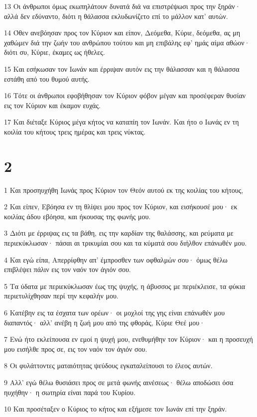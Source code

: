 \par 13 Οι άνθρωποι όμως εκωπηλάτουν δυνατά διά να επιστρέψωσι προς την ξηράν· αλλά δεν εδύναντο, διότι η θάλασσα εκλυδωνίζετο επί το μάλλον κατ' αυτών.
\par 14 Όθεν ανεβόησαν προς τον Κύριον και είπον, Δεόμεθα, Κύριε, δεόμεθα, ας μη χαθώμεν διά την ζωήν του ανθρώπου τούτου και μη επιβάλης εφ' ημάς αίμα αθώον· διότι συ, Κύριε, έκαμες ως ήθελες.
\par 15 Και εσήκωσαν τον Ιωνάν και έρριψαν αυτόν εις την θάλασσαν και η θάλασσα εστάθη από του θυμού αυτής.
\par 16 Τότε οι άνθρωποι εφοβήθησαν τον Κύριον φόβον μέγαν και προσέφεραν θυσίαν εις τον Κύριον και έκαμον ευχάς.
\par 17 Και διέταξε Κύριος μέγα κήτος να καταπίη τον Ιωνάν. Και ήτο ο Ιωνάς εν τη κοιλία του κήτους τρεις ημέρας και τρεις νύκτας.

\chapter{2}

\par 1 Και προσηυχήθη Ιωνάς προς Κύριον τον Θεόν αυτού εκ της κοιλίας του κήτους,
\par 2 Και είπεν, Εβόησα εν τη θλίψει μου προς τον Κύριον, και εισήκουσέ μου· εκ κοιλίας άδου εβόησα, και ήκουσας της φωνής μου.
\par 3 Διότι με έρριψας εις τα βάθη, εις την καρδίαν της θαλάσσης, και ρεύματα με περιεκύκλωσαν· πάσαι αι τρικυμίαι σου και τα κύματά σου διήλθον επάνωθέν μου.
\par 4 Και εγώ είπα, Απερρίφθην απ' έμπροσθεν των οφθαλμών σου· όμως θέλω επιβλέψει πάλιν εις τον ναόν τον άγιόν σου.
\par 5 Τα ύδατα με περιεκύκλωσαν έως της ψυχής, η άβυσσος με περιέκλεισε, τα φύκια περιετυλίχθησαν περί την κεφαλήν μου.
\par 6 Κατέβην εις τα έσχατα των ορέων· οι μοχλοί της γης είναι επάνωθέν μου διαπαντός· αλλ' ανέβη η ζωή μου από της φθοράς, Κύριε Θεέ μου·
\par 7 Ενώ ήτο εκλείπουσα εν εμοί η ψυχή μου, ενεθυμήθην τον Κύριον· και η προσευχή μου εισήλθε προς σε, εις τον ναόν τον άγιόν σου.
\par 8 Οι φυλάττοντες ματαιότητας ψεύδους εγκαταλείπουσι το έλεος αυτών.
\par 9 Αλλ' εγώ θέλω θυσιάσει προς σε μετά φωνής αινέσεως· θέλω αποδώσει όσα ηυχήθην· η σωτηρία είναι παρά του Κυρίου.
\par 10 Και προσέταξεν ο Κύριος το κήτος και εξήμεσε τον Ιωνάν επί την ξηράν.

